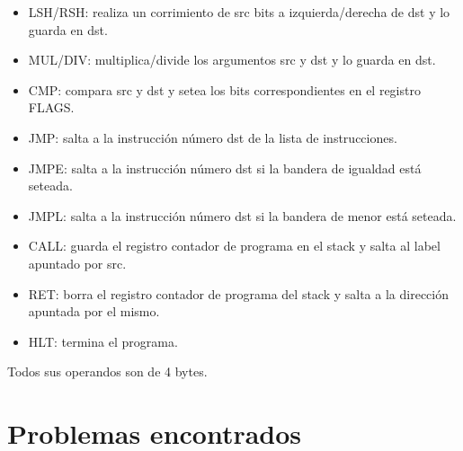 \documentclass[a4paper,12pt]{article}
\begin{document}
\begin{itemize}
\begin{itemize}
\item LSH/RSH: realiza un corrimiento de src bits a izquierda/derecha de dst y lo guarda en dst.
\item MUL/DIV: multiplica/divide los argumentos src y dst y lo guarda en dst.
\item CMP: compara src y dst y setea los bits correspondientes en el registro FLAGS.
\item JMP: salta a la instrucci\'on n\'umero dst de la lista de instrucciones.
\item JMPE: salta a la instrucci\'on n\'umero dst si la bandera de igualdad est\'a seteada.
\item JMPL: salta a la instrucci\'on n\'umero dst si la bandera de menor est\'a seteada.
\item CALL: guarda el registro contador de programa en el stack y salta al label apuntado por src.
\item RET: borra el registro contador de programa del stack y salta a la direcci\'on apuntada por el mismo.
\item HLT: termina el programa.
\end{itemize}
\end{itemize}

Todos sus operandos son de 4 bytes.
	
\section{Problemas encontrados}
\end{document}
